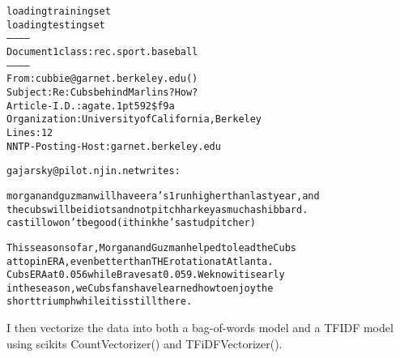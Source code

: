 \documentclass[letterpaper,10pt,english]{/usr/local/lib/python3.4/dist-packages/sphinx/texinputs/sphinxhowto}
\newenvironment{InvisibleVerbatim}
        {\begin{mdframed}[leftmargin=0.1\linewidth,innerleftmargin=3pt,innerrightmargin=3pt, userdefinedwidth=1\linewidth, linewidth=0pt, linecolor=white, usetwoside=false]}
        {\end{mdframed}}
\begin{document}
        

            
                \begin{InvisibleVerbatim}
                \vspace{-0.5\baselineskip}
\begin{alltt}loading training set
loading testing set
-----------
Document 1 class: rec.sport.baseball
-----------
From: cubbie@garnet.berkeley.edu (                               )
Subject: Re: Cubs behind Marlins? How?
Article-I.D.: agate.1pt592\$f9a
Organization: University of California, Berkeley
Lines: 12
NNTP-Posting-Host: garnet.berkeley.edu


gajarsky@pilot.njin.net writes:

morgan and guzman will have era's 1 run higher than last year, and
 the cubs will be idiots and not pitch harkey as much as hibbard.
 castillo won't be good (i think he's a stud pitcher)

       This season so far, Morgan and Guzman helped to lead the Cubs
       at top in ERA, even better than THE rotation at Atlanta.
       Cubs ERA at 0.056 while Braves at 0.059. We know it is early
       in the season, we Cubs fans have learned how to enjoy the
       short triumph while it is still there.

\end{alltt}

            \end{InvisibleVerbatim}
            
        
    
I then vectorize the data into both a bag-of-words model and a TFIDF
model using scikits CountVectorizer() and TFiDFVectorizer().

\end{document}
